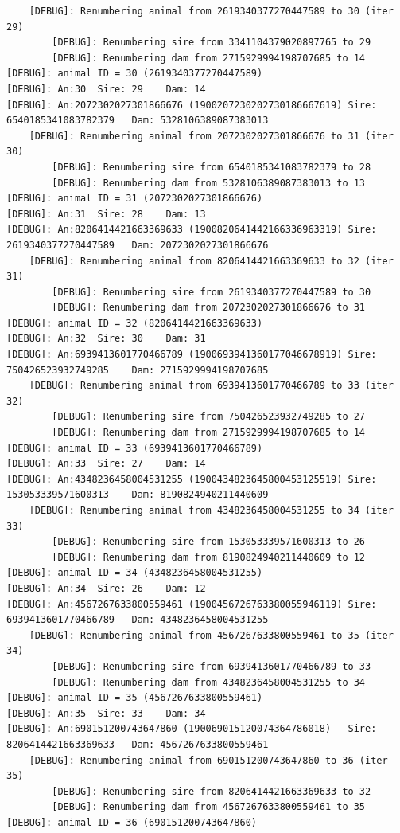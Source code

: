 \documentclass[
  letterpaper,
  DIV=11,
  numbers=noendperiod]{scrreprt}
\begin{document}
\begin{codelisting}
{\begin{verbatim}
    [DEBUG]: Renumbering animal from 2619340377270447589 to 30 (iter 29)
        [DEBUG]: Renumbering sire from 3341104379020897765 to 29
        [DEBUG]: Renumbering dam from 2715929994198707685 to 14
[DEBUG]: animal ID = 30 (2619340377270447589)
[DEBUG]: An:30  Sire: 29    Dam: 14
[DEBUG]: An:2072302027301866676 (1900207230202730186667619) Sire: 6540185341083782379   Dam: 5328106389087383013
    [DEBUG]: Renumbering animal from 2072302027301866676 to 31 (iter 30)
        [DEBUG]: Renumbering sire from 6540185341083782379 to 28
        [DEBUG]: Renumbering dam from 5328106389087383013 to 13
[DEBUG]: animal ID = 31 (2072302027301866676)
[DEBUG]: An:31  Sire: 28    Dam: 13
[DEBUG]: An:8206414421663369633 (1900820641442166336963319) Sire: 2619340377270447589   Dam: 2072302027301866676
    [DEBUG]: Renumbering animal from 8206414421663369633 to 32 (iter 31)
        [DEBUG]: Renumbering sire from 2619340377270447589 to 30
        [DEBUG]: Renumbering dam from 2072302027301866676 to 31
[DEBUG]: animal ID = 32 (8206414421663369633)
[DEBUG]: An:32  Sire: 30    Dam: 31
[DEBUG]: An:6939413601770466789 (1900693941360177046678919) Sire: 750426523932749285    Dam: 2715929994198707685
    [DEBUG]: Renumbering animal from 6939413601770466789 to 33 (iter 32)
        [DEBUG]: Renumbering sire from 750426523932749285 to 27
        [DEBUG]: Renumbering dam from 2715929994198707685 to 14
[DEBUG]: animal ID = 33 (6939413601770466789)
[DEBUG]: An:33  Sire: 27    Dam: 14
[DEBUG]: An:4348236458004531255 (1900434823645800453125519) Sire: 153053339571600313    Dam: 8190824940211440609
    [DEBUG]: Renumbering animal from 4348236458004531255 to 34 (iter 33)
        [DEBUG]: Renumbering sire from 153053339571600313 to 26
        [DEBUG]: Renumbering dam from 8190824940211440609 to 12
[DEBUG]: animal ID = 34 (4348236458004531255)
[DEBUG]: An:34  Sire: 26    Dam: 12
[DEBUG]: An:4567267633800559461 (1900456726763380055946119) Sire: 6939413601770466789   Dam: 4348236458004531255
    [DEBUG]: Renumbering animal from 4567267633800559461 to 35 (iter 34)
        [DEBUG]: Renumbering sire from 6939413601770466789 to 33
        [DEBUG]: Renumbering dam from 4348236458004531255 to 34
[DEBUG]: animal ID = 35 (4567267633800559461)
[DEBUG]: An:35  Sire: 33    Dam: 34
[DEBUG]: An:690151200743647860 (190069015120074364786018)   Sire: 8206414421663369633   Dam: 4567267633800559461
    [DEBUG]: Renumbering animal from 690151200743647860 to 36 (iter 35)
        [DEBUG]: Renumbering sire from 8206414421663369633 to 32
        [DEBUG]: Renumbering dam from 4567267633800559461 to 35
[DEBUG]: animal ID = 36 (690151200743647860)

\end{verbatim}}
\end{codelisting}
\end{document}

